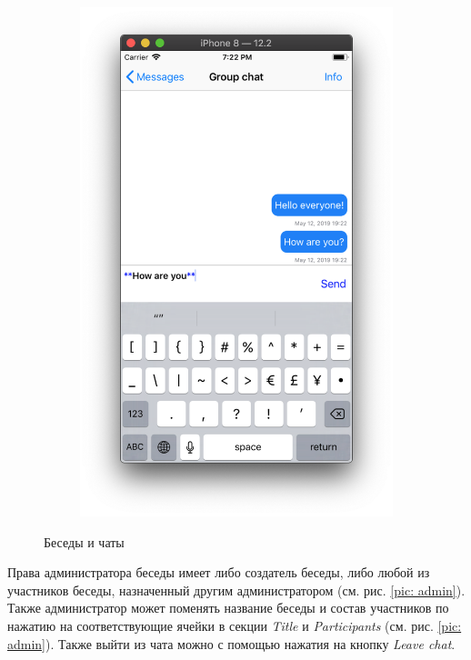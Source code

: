 \documentclass[a4paper,12pt]{article}
\begin{document}
\begin{figure}[h!]
\begin{subfigure}[b]{0.3\linewidth}
			\includegraphics[width=\linewidth]{../includes/pmi/groupChat.png}
		\end{subfigure}
		\caption{\label{pic: chats}Беседы и чаты}
	\end{figure}
	Права администратора беседы имеет либо создатель беседы, либо любой из участников беседы, назначенный другим администратором (см. рис. \ref{pic: admin}). Также администратор может поменять название беседы и состав участников по нажатию на соответствующие ячейки в секции \textit{Title} и  \textit{Participants} (см. рис. \ref{pic: admin}). Также выйти из чата можно с помощью нажатия на кнопку \textit{Leave chat}.
\end{document}
